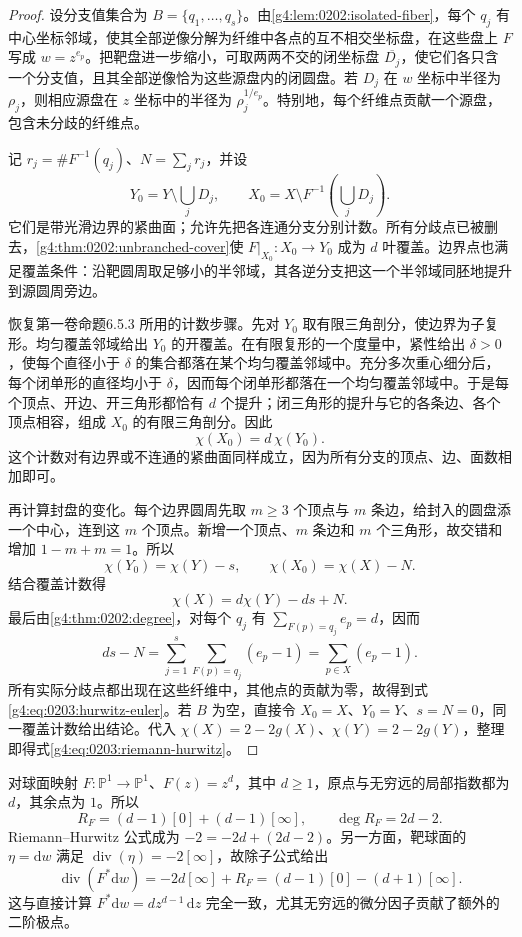 \begin{proof}
	设分支值集合为 \(B=\{q_1,\ldots,q_s\}\)。由\cref{g4:lem:0202:isolated-fiber}，每个 \(q_j\) 有中心坐标邻域，使其全部逆像分解为纤维中各点的互不相交坐标盘，在这些盘上 \(F\) 写成 \(w=z^{e_p}\)。把靶盘进一步缩小，可取两两不交的闭坐标盘 \(\overline{D_j}\)，使它们各只含一个分支值，且其全部逆像恰为这些源盘内的闭圆盘。若 \(D_j\) 在 \(w\) 坐标中半径为 \(\rho_j\)，则相应源盘在 \(z\) 坐标中的半径为 \(\rho_j^{1/e_p}\)。特别地，每个纤维点贡献一个源盘，包含未分歧的纤维点。

	记 \(r_j=\#F^{-1}(q_j)\)、\(N=\sum_jr_j\)，并设
	\[
		Y_0=Y\setminus\bigcup_jD_j,\qquad
		X_0=X\setminus F^{-1}\left(\bigcup_jD_j\right).
	\]
	它们是带光滑边界的紧曲面；允许先把各连通分支分别计数。所有分歧点已被删去，\cref{g4:thm:0202:unbranched-cover}使 \(F|_{X_0}:X_0\rightarrow Y_0\) 成为 \(d\) 叶覆盖。边界点也满足覆盖条件：沿靶圆周取足够小的半邻域，其各逆分支把这一个半邻域同胚地提升到源圆周旁边。

	恢复第一卷命题6.5.3 所用的计数步骤。先对 \(Y_0\) 取有限三角剖分，使边界为子复形。均匀覆盖邻域给出 \(Y_0\) 的开覆盖。在有限复形的一个度量中，紧性给出 \(\delta>0\)，使每个直径小于 \(\delta\) 的集合都落在某个均匀覆盖邻域中。充分多次重心细分后，每个闭单形的直径均小于 \(\delta\)，因而每个闭单形都落在一个均匀覆盖邻域中。于是每个顶点、开边、开三角形都恰有 \(d\) 个提升；闭三角形的提升与它的各条边、各个顶点相容，组成 \(X_0\) 的有限三角剖分。因此
	\[
		\chi(X_0)=d\,\chi(Y_0).
	\]
	这个计数对有边界或不连通的紧曲面同样成立，因为所有分支的顶点、边、面数相加即可。

	再计算封盘的变化。每个边界圆周先取 \(m\ge3\) 个顶点与 \(m\) 条边，给封入的圆盘添一个中心，连到这 \(m\) 个顶点。新增一个顶点、\(m\) 条边和 \(m\) 个三角形，故交错和增加 \(1-m+m=1\)。所以
	\[
		\chi(Y_0)=\chi(Y)-s,\qquad
		\chi(X_0)=\chi(X)-N.
	\]
	结合覆盖计数得
	\[
		\chi(X)=d\chi(Y)-ds+N.
	\]
	最后由\cref{g4:thm:0202:degree}，对每个 \(q_j\) 有 \(\sum_{F(p)=q_j}e_p=d\)，因而
	\[
		ds-N
		=\sum_{j=1}^s\sum_{F(p)=q_j}(e_p-1)
		=\sum_{p\in X}(e_p-1).
	\]
	所有实际分歧点都出现在这些纤维中，其他点的贡献为零，故得到式\eqref{g4:eq:0203:hurwitz-euler}。若 \(B\) 为空，直接令 \(X_0=X\)、\(Y_0=Y\)、\(s=N=0\)，同一覆盖计数给出结论。代入 \(\chi(X)=2-2g(X)\)、\(\chi(Y)=2-2g(Y)\)，整理即得式\eqref{g4:eq:0203:riemann-hurwitz}。
\end{proof}

\begin{example}
	\label{g4:exm:0203:power-map-hurwitz}
	对球面映射 \(F:\mathbb P^1\rightarrow\mathbb P^1\)、\(F(z)=z^d\)，其中 \(d\ge1\)，原点与无穷远的局部指数都为 \(d\)，其余点为 \(1\)。所以
	\[
		R_F=(d-1)[0]+(d-1)[\infty],\qquad \deg R_F=2d-2.
	\]
	Riemann--Hurwitz 公式成为 \(-2=-2d+(2d-2)\)。另一方面，靶球面的 \(\eta=\mathrm{d}w\) 满足 \(\operatorname{div}(\eta)=-2[\infty]\)，故除子公式给出
	\[
		\operatorname{div}(F^*\mathrm{d}w)
		=-2d[\infty]+R_F
		=(d-1)[0]-(d+1)[\infty].
	\]
	这与直接计算 \(F^*\mathrm{d}w=d z^{d-1}\,\mathrm{d}z\) 完全一致，尤其无穷远的微分因子贡献了额外的二阶极点。
\end{example}

